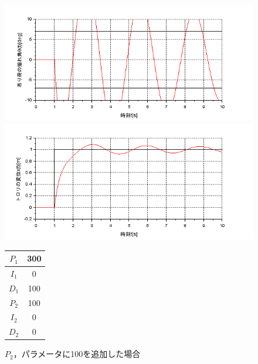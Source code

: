 \documentclass[dvipdfmx,titlepage,a4j]{jsarticle}  %
\begin{document}
\begin{figure}[H]
  \begin{minipage}{4.5cm}
    \centering
    \includegraphics[keepaspectratio, scale=0.35]{../graph/crane/ang-P1-300-I1-0-D1-100-P2-100-I2-0-D2-0.png}
  \end{minipage}
  \hfill
  \begin{minipage}{4.5cm}
    \centering
    \includegraphics[keepaspectratio, scale=0.35]{../graph/crane/po-P1-300-I1-0-D1-100-P2-100-I2-0-D2-0.png}
  \end{minipage}
  \hfill
  \begin{minipage}{3cm}
    \begin{center}
      \begin{tabular}{c|c}
        \hline
        $P_1$ & 300\\ \hline
        $I_1$ & 0\\ \hline
        $D_1$ & 100\\ \hline
        $P_2$ & 100\\ \hline
        $I_2$ & 0\\ \hline
        $D_2$ & 0\\
        \hline
      \end{tabular}
    \end{center}
  \end{minipage}
  \hfill
  \caption{$P_2$，パラメータに100を追加した場合}
  \label{fig:crane:7}
\end{figure}
\end{document}
